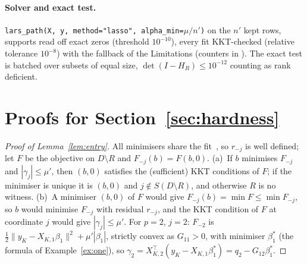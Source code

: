 \documentclass[10pt,a4paper]{article}
\theoremstyle{plain}
\theoremstyle{definition}
\theoremstyle{remark}
\newcommand{\Dm}{D\setminus R}
\begin{document}
\paragraph{Solver and exact test.} \texttt{lars\_path(X, y, method="lasso", alpha\_min=$\mu/n'$)} on the $n'$ kept rows, supports read off exact zeros (threshold $10^{-10}$), every fit KKT-checked (relative tolerance $10^{-8}$) with the fallback of the Limitations (counters in ). The exact test is batched over subsets of equal size, $\det(I-H_R)\le10^{-12}$ counting as rank deficient.

\section{Proofs for Section~\ref{sec:hardness}}\label{app:proofs}

\begin{proof}[Proof of Lemma~\ref{lem:entry}]
All minimisers share the fit~\citep{tibshirani2013}, so $r_{-j}$ is well defined; let $F$ be the objective on $\Dm$ and $F_{-j}(b)=F(b,0)$. (a)~If $b$ minimises $F_{-j}$ and $|\gamma_j|\le\mu'$, then $(b,0)$ satisfies the (sufficient) KKT conditions of $F$; if the minimiser is unique it is $(b,0)$ and $j\notin S(\Dm)$, and otherwise $R$ is no witness. (b)~A minimiser $(b,0)$ of $F$ would give $F_{-j}(b)=\min F\le\min F_{-j}$, so $b$ would minimise $F_{-j}$ with residual $r_{-j}$, and the KKT condition of $F$ at coordinate $j$ would give $|\gamma_j|\le\mu'$. For $p=2$, $j=2$: $F_{-2}$ is $\frac12\lVert y_K-X_{K,1}\beta_1\rVert^2+\mu'|\beta_1|$, strictly convex as $G_{11}>0$, with minimiser $\beta_1^\ast$ (the formula of Example~\ref{ex:one}), so $\gamma_2=X_{K,2}^{\top}(y_K-X_{K,1}\beta_1^\ast)=q_2-G_{12}\beta_1^\ast$.
\end{proof}
\end{document}

